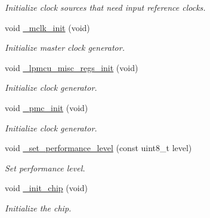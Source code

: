 \begin{DoxyCompactItemize}
\begin{DoxyCompactList}\small\item\em Initialize clock sources that need input reference clocks. \end{DoxyCompactList}\item 
void \hyperlink{group___h_p_l_ga840b5c5290dd94e858db4d89259ba3f4}{\+\_\+mclk\+\_\+init} (void)
\begin{DoxyCompactList}\small\item\em Initialize master clock generator. \end{DoxyCompactList}\item 
void \hyperlink{group___h_p_l_ga3dd85007c9fdeed2ffe1166a33dd6519}{\+\_\+lpmcu\+\_\+misc\+\_\+regs\+\_\+init} (void)
\begin{DoxyCompactList}\small\item\em Initialize clock generator. \end{DoxyCompactList}\item 
void \hyperlink{group___h_p_l_ga580e99e942064901ed0f02f5d8789c7a}{\+\_\+pmc\+\_\+init} (void)
\begin{DoxyCompactList}\small\item\em Initialize clock generator. \end{DoxyCompactList}\item 
void \hyperlink{group___h_p_l_ga1668b7fc690ec56e1f3d54d9f3b8e5f2}{\+\_\+set\+\_\+performance\+\_\+level} (const uint8\+\_\+t level)
\begin{DoxyCompactList}\small\item\em Set performance level. \end{DoxyCompactList}\item 
void \hyperlink{group___h_p_l_gac10942d1aec3f0ce14117119db5e9555}{\+\_\+init\+\_\+chip} (void)
\begin{DoxyCompactList}\small\item\em Initialize the chip. \end{DoxyCompactList}\end{DoxyCompactItemize}
